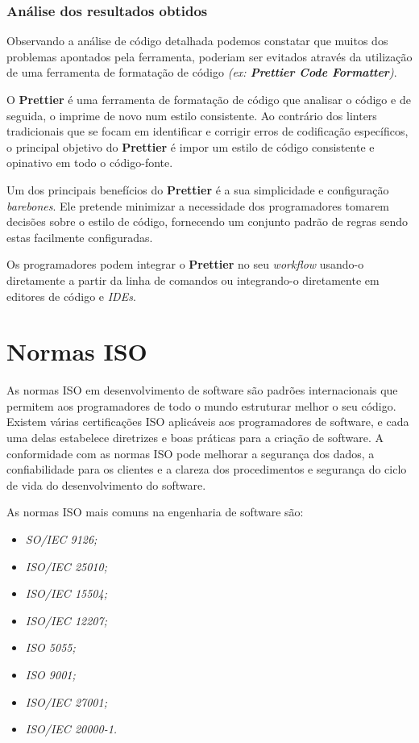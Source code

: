 \documentclass[a4paper,12pt]{article} %
\begin{document}
\newpage
\subsubsection{Análise dos resultados obtidos}
Observando a análise de código detalhada podemos constatar que muitos dos problemas apontados pela ferramenta, poderiam ser evitados através da utilização de uma ferramenta de formatação de código \textit{(ex: \textbf{Prettier Code Formatter})}.

\hfill

O \textbf{Prettier} é uma ferramenta de formatação de código que analisar o código e de seguida, o imprime de novo num estilo consistente. Ao contrário dos linters tradicionais que se focam em identificar e corrigir erros de codificação específicos, o principal objetivo do \textbf{Prettier} é impor um estilo de código consistente e opinativo em todo o código-fonte.

Um dos principais benefícios do \textbf{Prettier} é a sua simplicidade e configuração \textit{barebones}. Ele pretende minimizar a necessidade dos programadores tomarem decisões sobre o estilo de código, fornecendo um conjunto padrão de regras sendo estas facilmente configuradas.

Os programadores podem integrar o \textbf{Prettier} no seu \textit{workflow} usando-o diretamente a partir da linha de comandos ou integrando-o diretamente em editores de código e \textit{IDEs}.

\newpage
\section{Normas ISO}
As normas ISO em desenvolvimento de software são padrões internacionais que permitem aos programadores de todo o mundo estruturar melhor o seu código. Existem várias certificações ISO aplicáveis aos programadores de software, e cada uma delas estabelece diretrizes e boas práticas para a criação de software. A conformidade com as normas ISO pode melhorar a segurança dos dados, a confiabilidade para os clientes e a clareza dos procedimentos e segurança do ciclo de vida do desenvolvimento do software.

As normas ISO mais comuns na engenharia de software são:
\begin{itemize}
	\item \textit{SO/IEC 9126;}
	\item \textit{ISO/IEC 25010;}
	\item \textit{ISO/IEC 15504;}
	\item \textit{ISO/IEC 12207;}
	\item \textit{ISO 5055;}
	\item \textit{ISO 9001;}
	\item \textit{ISO/IEC 27001;}
	\item \textit{ISO/IEC 20000-1.}
\end{itemize}
\end{document}
